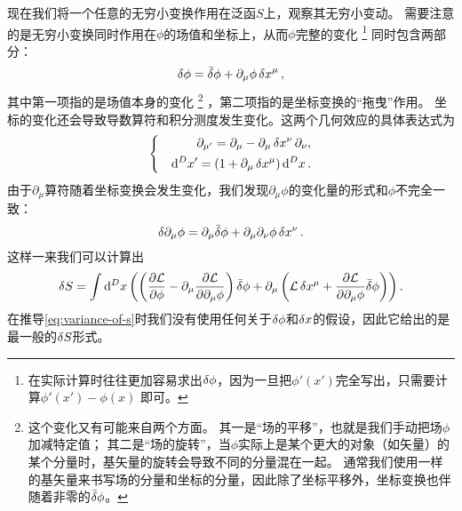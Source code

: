\documentclass[UTF8, a4paper]{ctexart}
\newenvironment{bigcase}{\left\{\quad\begin{aligned}}{\end{aligned}\right.}
\begin{document}
现在我们将一个任意的无穷小变换作用在泛函$S$上，观察其无穷小变动。
需要注意的是无穷小变换同时作用在$\phi$的场值和坐标上，从而$\phi$完整的变化%
\footnote{在实际计算时往往更加容易求出$\var{\phi}$，因为一旦把$\phi'(x')$完全写出，只需要计算$\phi'(x')-\phi(x)$ 即可。}%
同时包含两部分：
\begin{equation}
    \var{\phi} = \bar{\var} \phi + \partial_\mu \phi \var{x}^\mu,
    \label{eq:variance-of-phi}
\end{equation}
其中第一项指的是场值本身的变化%
\footnote{这个变化又有可能来自两个方面。
其一是“场的平移”，也就是我们手动把场$\phi$加减特定值；
其二是“场的旋转”，当$\phi$实际上是某个更大的对象（如矢量）的某个分量时，基矢量的旋转会导致不同的分量混在一起。
通常我们使用一样的基矢量来书写场的分量和坐标的分量，因此除了坐标平移外，坐标变换也伴随着非零的$\bar{\var}{\phi}$。}%
，第二项指的是坐标变换的“拖曳”作用。
坐标的变化还会导致导数算符和积分测度发生变化。这两个几何效应的具体表达式为
\begin{equation}
    \begin{bigcase}
        \partial_{\mu'} = \partial_\mu - \partial_\mu \var{x^\nu} \partial_\nu, \\
        \dd[D]{x'} = (1 + \partial_\mu \var{x^\mu}) \dd[D]{x}.
    \end{bigcase}
\end{equation}
由于$\partial_\mu$算符随着坐标变换会发生变化，我们发现$\partial_\mu \phi$的变化量的形式和$\phi$不完全一致：
\begin{equation}
    \var{\partial_\mu \phi} = \partial_\mu \bar{\var}{\phi} + \partial_\mu \partial_\nu \phi \var{x^\nu}.
\end{equation}
这样一来我们可以计算出
\begin{equation}
    \var{S} = \int \dd[D]{x} \left(
        \left( \pdv{\mathcal{L}}{\phi} - \partial_\mu \pdv{\mathcal{L}}{\partial_\mu \phi} \right) \bar{\var}{\phi} + 
        \partial_\mu \left( \mathcal{L} \var{x^\mu} + \pdv{\mathcal{L}}{\partial_\mu \phi} \bar{\var}{\phi} \right)
    \right).
    \label{eq:variance-of-s}
\end{equation}
在推导\eqref{eq:variance-of-s}时我们没有使用任何关于$\var{\phi}$和$\var{x}$的假设，因此它给出的是最一般的$\var{S}$形式。
\end{document}
